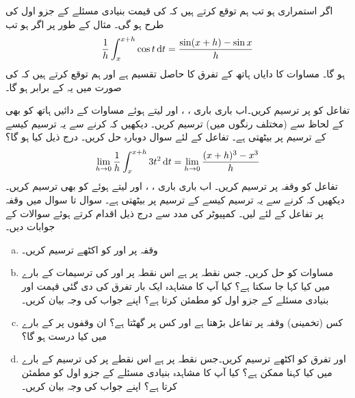 \\
\\
اگر  استمراری ہو تب ہم توقع کرتے ہیں کہ  کی قیمت بنیادی مسئلے کے جزو اول کی طرح   ہو گی۔ مثال کے طور پر  اگر  ہو تب
\begin{align}\label{مساوات_تکمل_کوسائن_کا_تکمل}
\frac{1}{h}\int_x^{x+h}\cos t\dif t=\frac{\sin(x+h)-\sin x}{h}
\end{align}
ہو گا۔ مساوات  کا دایاں ہاتھ  کے تفرق کا حاصل تقسیم ہے اور ہم توقع کرتے ہیں کہ  کی صورت میں یہ  کے برابر ہو گا۔

تفاعل  کو  پر ترسیم کریں۔اب باری باری ، ،  اور  لیتے ہوئے مساوات  کے دائیں ہاتھ کو بھی  کے لحاظ سے (مختلف رنگوں میں) ترسیم کریں۔ دیکھیں کہ  کرنے سے یہ ترسیم کیسے  کے ترسیم پر بیٹھتی ہے۔ 
تفاعل  کے لئے سوال  دوبارہ حل کریں۔ درج ذیل کیا ہو گا؟
\begin{align*}
\lim_{h\to0}\frac{1}{h}\int_x^{x+h}3t^2\dif t=\lim_{h\to 0}\frac{(x+h)^3-x^3}{h}
\end{align*}
 تفاعل  کو وقفہ  پر ترسیم کریں۔ اب باری باری ، ،  اور   لیتے ہوئے  کو بھی ترسیم کریں۔ دیکھیں کہ  کرنے سے یہ ترسیم کیسے  کے ترسیم پر بیٹھتی  ہے۔
سوال  تا سوال  میں وقفہ  پر تفاعل  کے لئے  لیں۔ کمپیوٹر کی مدد سے درج ذیل اقدام کرتے ہوئے سوالات کے جوابات دیں۔
\begin{enumerate}[a.]
\item
وقفہ  پر  اور  کو اکٹھے ترسیم کریں۔
\item
مساوات  کو حل کریں۔ جس نقطہ پر   ہے اس نقطہ پر  اور  کی ترسیمات کے بارے میں کیا کہا جا سکتا ہے؟ کیا آپ کا مشاہدہ ایک بار تفرق کی دی گئی قیمت اور بنیادی مسئلے کے جزو اول کو مطمئن کرتا ہے؟ اپنے جواب کی وجہ بیان کریں۔
\item
کس (تخمینی) وقفہ پر تفاعل  بڑھتا ہے اور کس پر گھٹتا ہے؟ ان وقفوں پر  کے بارے میں کیا درست ہو گا؟
\item
{} اور تفرق  کو اکٹھے ترسیم کریں۔جس نقطہ پر  ہے اس نقطے پر  کی ترسیم کے بارے میں کیا کہنا ممکن ہے؟ کیا آپ کا مشاہدہ بنیادی مسئلے کے جزو اول کو مطمئن کرتا ہے؟ اپنے جواب کی وجہ بیان کریں۔ 
\end{enumerate} 

